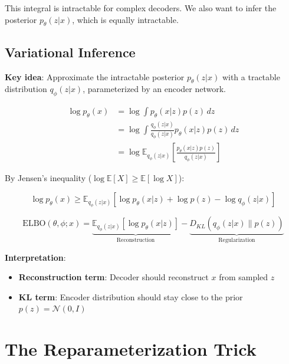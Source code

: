This integral is intractable for complex decoders. We also want to infer the posterior $p_\theta(z|x)$, which is equally intractable.

\subsection{Variational Inference}

\textbf{Key idea}: Approximate the intractable posterior $p_\theta(z|x)$ with a tractable distribution $q_\phi(z|x)$, parameterized by an encoder network.

\begin{align}
    \log p_\theta(x) &= \log \int p_\theta(x|z) p(z) \, dz \\
    &= \log \int \frac{q_\phi(z|x)}{q_\phi(z|x)} p_\theta(x|z) p(z) \, dz \\
    &= \log \mathbb{E}_{q_\phi(z|x)} \left[ \frac{p_\theta(x|z) p(z)}{q_\phi(z|x)} \right]
\end{align}

By Jensen's inequality ($\log \mathbb{E}[X] \geq \mathbb{E}[\log X]$):

\begin{equation}
    \log p_\theta(x) \geq \mathbb{E}_{q_\phi(z|x)} \left[ \log p_\theta(x|z) + \log p(z) - \log q_\phi(z|x) \right]
\end{equation}

\begin{definition}
\begin{equation}
    \text{ELBO}(\theta, \phi; x) = \underbrace{\mathbb{E}_{q_\phi(z|x)}[\log p_\theta(x|z)]}_{\text{Reconstruction}} - \underbrace{D_{KL}(q_\phi(z|x) \| p(z))}_{\text{Regularization}}
    \label{eq:elbo}
\end{equation}
\end{definition}


\textbf{Interpretation}:
\begin{itemize}
    \item \textbf{Reconstruction term}: Decoder should reconstruct $x$ from sampled $z$
    \item \textbf{KL term}: Encoder distribution should stay close to the prior $p(z) = \mathcal{N}(0, I)$
\end{itemize}


\section{The Reparameterization Trick}

